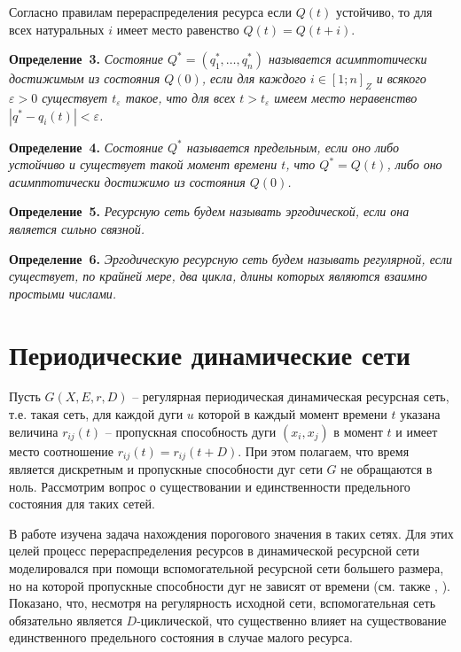 \documentclass[a4paper,12pt]{article}
\begin{document}
Согласно правилам перераспределения ресурса если ${Q}(t)$ ус\-тойчиво, то для всех натуральных $i$ имеет место равенство ${Q}(t)={Q}(t+i)$.

{\bf Определение~3. }{\it  
Состояние ${Q}^*=(q^*_1,\dots,q^*_n)$ называется асимптотически достижимым из состояния ${Q}(0)$, если для каждого $i\in[1;n]_Z$ и всякого $\varepsilon>0$ существует $t_{\varepsilon}$ такое, что для всех $t>t_{\varepsilon}$ имеем место неравенство $|q^*-q_i(t)|<\varepsilon$.
}

{\bf Определение~4. }{\it 
Состояние ${Q}^*$ называется предельным, если оно либо устойчиво и существует такой момент времени $t$, что ${Q}^*={Q}(t)$, либо оно асимптотически достижимо из состояния ${Q}(0)$.
}



{\bf Определение~5. }{\it 
Ресурсную сеть будем называть эргодической, если она является сильно связной.
}

{\bf Определение~6. }{\it 
Эргодическую ресурсную сеть будем называть регулярной, если существует, по крайней мере, два цикла, длины которых являются взаимно простыми числами.
}

\section{Периодические динамические сети}

\indent

Пусть $G(X,E,r,D)$ -- регулярная периодическая динамическая ресурсная сеть, т.е. такая сеть, для каждой дуги $u$  которой в каждый момент времени $t$ указана величина $r_{ij}(t)$ -- пропускная способность дуги $(x_i,x_j)$ в момент $t$ и имеет место соотношение $r_{ij}(t)=r_{ij}(t+D)$. При этом полагаем, что время является дискретным и пропускные способности дуг сети $G$ не обращаются в ноль. Рассмотрим вопрос о существовании и единственности предельного состояния для таких сетей.

В работе \cite{SvSkor:SkorAbdur} изучена задача нахождения порогового значения в таких сетях. Для этих целей процесс перераспределения ресурсов в динамической ресурсной сети моделировался при помощи вспомогательной ресурсной сети большего размера, но на которой пропускные способности дуг не зависят от времени (см. также \cite{SvSkor:Skor1}, \cite{SvSkor:Kuzm}). Показано, что, несмотря на регулярность исходной сети, вспомогательная сеть обязательно является $D$-циклической, что существенно влияет на существование единственного предельного состояния в случае малого ресурса.  
\end{document}
